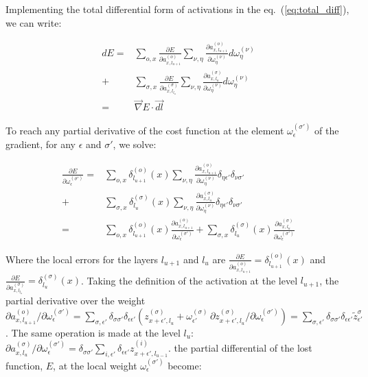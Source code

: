 \documentclass[final, paper=letter,5p,times,twocolumn]{elsarticle}
\begin{document}
Implementing the total differential form of activations in the eq.~(\ref{eq:total_diff}), we can write:

\begin{equation*}  
\begin{split}
  dE = & \sum_{o,x} \frac{\partial E}{\partial a_{x,l_{u+1}}^{(o)}} \sum_{\nu,\eta} \frac{\partial a_{x,l_{u+1}}^{(o)}}{\partial \omega_{\eta}^{(\nu)}} d\omega_{\eta}^{(\nu)} \\
     + & \sum_{\sigma,x} \frac{\partial E}{\partial a_{x,l_{l_{u}}}^{(\sigma)}} \sum_{\nu,\eta} \frac{\partial a_{x,l_{u}}^{(\sigma)}}{\partial \omega_{\eta}^{(\nu)}} d\omega_{\eta}^{(\nu)} \\
     = & \vec{\nabla }E \cdot \vec{dl}
\end{split}
\end{equation*}

To reach any partial derivative of the cost function at the element $\omega_{\epsilon}^{(\sigma')}$ of the gradient, for any $\epsilon$ and $\sigma'$, we solve:

\begin{equation*}  
\begin{split}
  \frac{\partial E}{\partial \omega_{\epsilon}^{(\sigma')}} = & \sum_{o,x} \delta_{l_{u+1}}^{(o)}(x)\sum_{\nu,\eta} \frac{\partial a_{x,l_{u+1}}^{(o)}}{\partial \omega_{\eta}^{(\nu)}} \delta_{\eta \epsilon'}\delta_{\nu \sigma'} \\
  + & \sum_{\sigma,x}  \delta_{l_{u}}^{(\sigma)}(x) \sum_{\nu,\eta} \frac{\partial a_{x,l_{u}}^{(\sigma)}}{\partial \omega_{\eta}^{(\nu)}} \delta_{\eta \epsilon'}\delta_{\nu \sigma'} \\
  = & \sum_{o,x} \delta_{l_{u+1}}^{(o)}(x) \frac{\partial a_{x,l_{u+1}}^{(o)}}{\partial \omega_{\epsilon}^{(\sigma')}}  + \sum_{\sigma,x} \delta_{l_{u}}^{(\sigma)}(x) \frac{\partial a_{x,l_{u}}^{(\sigma)}}{\partial \omega_{\epsilon}^{(\sigma')}}
\end{split}
\end{equation*}

Where the local errors for the layers $l_{u+1}$ and $l_{u}$ are $\frac{\partial E}{\partial a_{x,l_{u+1}}^{(o)}} = \delta_{l_{u+1}}^{(o)}(x)$ and $\frac{\partial E}{\partial a_{x,l_{l_{u}}}^{(\sigma)}} = \delta_{l_{u}}^{(\sigma)}(x)$. Taking the definition of the activation at the level $l_{u+1}$, the partial derivative over the weight $\partial a_{x,l_{u+1}}^{(o)}/\partial \omega_{\epsilon}^{(\sigma')} = \sum_{\sigma, \epsilon'} \delta_{\sigma \sigma'}\delta_{\epsilon \epsilon'} \left( z_{x+\epsilon', l_{u}}^{(\sigma)} + \omega_{\epsilon'}^{(\sigma)} \, \partial z_{x+\epsilon',l_{u}}^{(\sigma)} / \partial \omega_{\epsilon}^{(\sigma')}\right) = \sum_{\sigma, \epsilon'} \delta_{\sigma \sigma'}\delta_{\epsilon \epsilon'} \tilde{z}_{\epsilon'}^{\sigma}$. The same operation is made at the level $l_{u}$: $\partial a_{x,l_{u}}^{(\sigma)}/\partial \omega_{\epsilon}^{(\sigma')} = \delta_{\sigma \sigma'} \sum_{i, \epsilon'} \delta_{\epsilon \epsilon'} z_{x+\epsilon', l_{u-1}}^{(i)}$. the partial differential of the lost function, $E$, at the local weight $\omega_{\epsilon}^{(\sigma')}$ become: 
\end{document}
